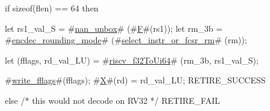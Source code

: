 if   sizeof(flen) == 64
then {
  let rs1_val_S = #\hyperref[sailRISCVznanzyunbox]{nan\_unbox}# (#\hyperref[sailRISCVzF]{F}#(rs1));
  let rm_3b     = #\hyperref[sailRISCVzencdeczyroundingzymode]{encdec\_rounding\_mode}# (#\hyperref[sailRISCVzselectzyinstrzyorzyfcsrzyrm]{select\_instr\_or\_fcsr\_rm}#  (rm));

  let (fflags, rd_val_LU) = #\hyperref[sailRISCVzriscvzyf32ToUi64]{riscv\_f32ToUi64}# (rm_3b, rs1_val_S);

  #\hyperref[sailRISCVzwritezyfflags]{write\_fflags}#(fflags);
  #\hyperref[sailRISCVzX]{X}#(rd) = rd_val_LU;
  RETIRE_SUCCESS
} else {
  /* this would not decode on RV32 */
  RETIRE_FAIL
}
